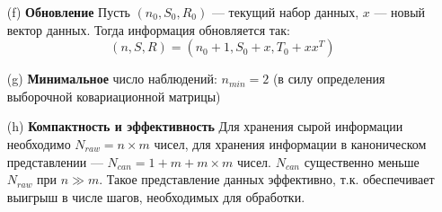 \documentclass[12pt,a4paper]{article}
\begin{document}
\begin{enumerate}
\item[(f)] \textbf{Обновление} Пусть $(n_0, S_0, R_0)$ --- текущий набор данных, $x$ --- новый вектор данных. Тогда информация обновляется так: $$(n, S, R) = (n_0 + 1, S_0 + x, T_0 + xx^T)$$

\item[(g)] \textbf{Минимальное} число наблюдений: $n_{min} = 2$ (в силу определения выборочной ковариационной матрицы)

\item[(h)] \textbf{Компактность и эффективность} Для хранения сырой информации необходимо $N_{raw} = n \times m$ чисел, для хранения информации в каноническом представлении --- $N_{can} = 1 + m + m \times m$ чисел. $N_{can}$ существенно меньше $N_{raw}$ при $n \gg m$.
Такое представление данных эффективно, т.к. обеспечивает выигрыш в числе шагов, необходимых для обработки. 

\end{enumerate}
\end{document}
